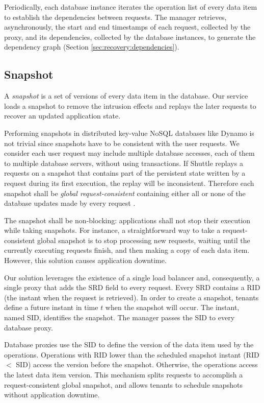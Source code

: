 \documentclass[10pt,conference]{IEEEtran}
\begin{document}
Periodically, each database instance iterates the operation list of every data item to establish the dependencies between requests. The manager retrieves, asynchronously, the start and end timestamps of each request, collected by the proxy, and its dependencies, collected by the database instances, to generate the dependency graph (Section \ref{sec:recovery:dependencies}).

\subsection{Snapshot}
\label{sec:architecture:snapshot}

A \emph{snapshot} is a set of versions of every data item in the database. Our service loads a snapshot to remove the intrusion effects and replays the later requests to recover an updated application state. 

Performing snapshots in distributed key-value NoSQL databases like Dynamo is not trivial since snapshots have to be consistent with the user requests. We consider each user request may include multiple database accesses, each of them to multiple database servers, without using transactions. 
If Shuttle replays a requests on a snapshot that contains part of the persistent state written by a request during its first execution, the replay will be inconsistent. Therefore each snapshot shall be \emph{global request-consistent} containing either all or none of the database updates made by every request \cite{checkpoint-survey}. 

The snapshot shall be non-blocking: applications shall not stop their execution while taking snapshots. For instance, a straightforward way to take a request-consistent global snapshot is to stop processing new requests, waiting until the currently executing requests finish, and then making a copy of each data item. However, this solution causes application downtime.

Our solution leverages the existence of a single load balancer and, consequently, a single proxy that adds the \ac{SRD} field to every request. Every \ac{SRD} contains a \ac{RID} (the instant when the request is retrieved). In order to create a snapshot, tenants define a future instant in time $t$ when the snapshot will occur. The instant, named \acf{SID}, identifies the snapshot. The manager passes the \ac{SID} to every database proxy.

Database proxies use the \ac{SID} to define the version of the data item used by the operations. Operations with \acf{RID} lower than the scheduled snapshot instant (\ac{RID} $<$ \ac{SID}) access the version before the snapshot. Otherwise, the operations access the latest data item version. This mechanism splits requests to accomplish a request-consistent global snapshot, and allows tenants to schedule snapshots without application downtime. 
\end{document}
